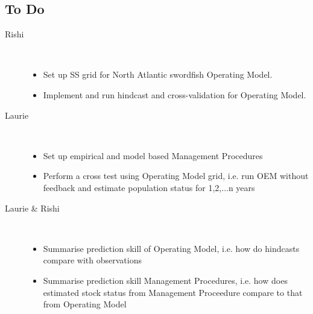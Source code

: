 \documentclass[a4paper,10pt]{article}
\begin{document}
\subsection*{To Do}
\begin{description}
  \item[Rishi] ~
  \begin{itemize}
    \item Set up SS grid for North Atlantic swordfish Operating Model.
    \item Implement and run hindcast and cross-validation for Operating Model.
  \end{itemize}

  \item[Laurie] ~
  \begin{itemize}
    \item Set up empirical and model based Management Procedures
    \item Perform a cross test using Operating Model grid, i.e. run OEM without feedback and estimate population status for 1,2,...n years 
  \end{itemize}
 
  \item[Laurie \& Rishi] ~
  \begin{itemize}
    \item Summarise prediction skill of Operating Model, i.e. how do hindcasts compare with observations
    \item Summarise prediction skill Management Procedures, i.e. how does estimated stock status from Management Proceedure compare to that from Operating Model 
  \end{itemize}
\end{description}
 
\end{document}
